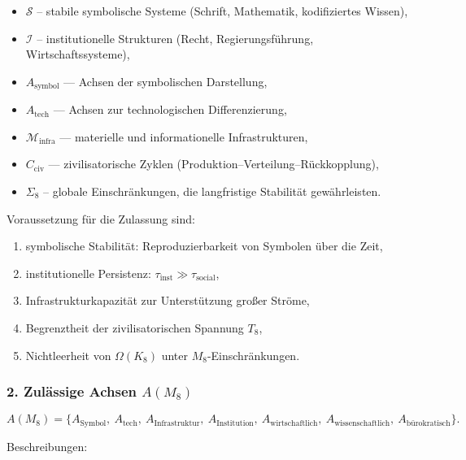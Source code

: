\begin{itemize}
    \item $\mathcal{S}$ – stabile symbolische Systeme (Schrift, Mathematik, kodifiziertes Wissen),
    \item $\mathcal{I}$ – institutionelle Strukturen (Recht, Regierungsführung, Wirtschaftssysteme),
    \item $A_{\mathrm{symbol}}$ — Achsen der symbolischen Darstellung,
    \item $A_{\mathrm{tech}}$ — Achsen zur technologischen Differenzierung,
    \item $\mathcal{M}_{\mathrm{infra}}$ — materielle und informationelle Infrastrukturen,
    \item $C_{\mathrm{civ}}$ — zivilisatorische Zyklen (Produktion–Verteilung–Rückkopplung),
    \item $\Sigma_8$ – globale Einschränkungen, die langfristige Stabilität gewährleisten.
\end{itemize}

Voraussetzung für die Zulassung sind:

\begin{enumerate}
    \item symbolische Stabilität: Reproduzierbarkeit von Symbolen über die Zeit,
    \item institutionelle Persistenz: $\tau_{\mathrm{inst}} \gg \tau_{\mathrm{social}}$,
    \item Infrastrukturkapazität zur Unterstützung großer Ströme,
    \item Begrenztheit der zivilisatorischen Spannung $T_8$,
    \item Nichtleerheit von $\Omega(K_8)$ unter $M_8$-Einschränkungen.
\end{enumerate}

\subsubsection*{2. Zulässige Achsen \texorpdfstring{$A(M_8)$}{A(M_8)}}

\[
A(M_8)=
\{
A_{\mathrm{Symbol}},\
A_{\mathrm{tech}},\
A_{\mathrm{Infrastruktur}},\
A_{\mathrm{Institution}},\
A_{\mathrm{wirtschaftlich}},\
A_{\mathrm{wissenschaftlich}},\
A_{\mathrm{bürokratisch}}
\}.
\]

Beschreibungen:

